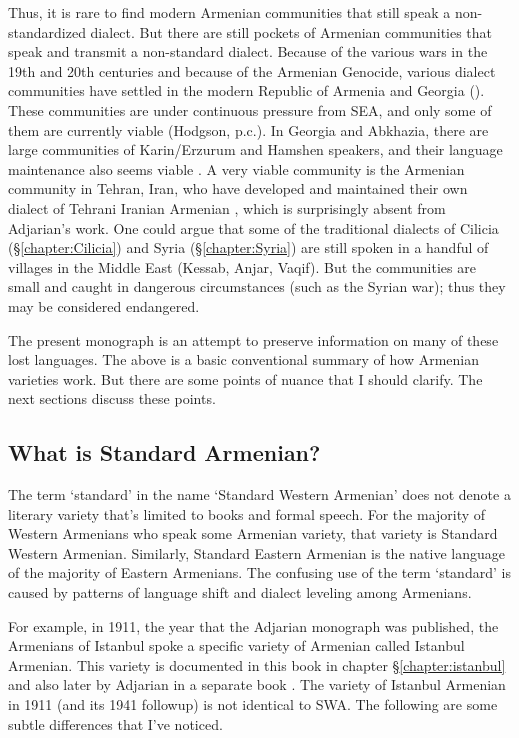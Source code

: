 Thus, it is  rare to find modern Armenian communities that still speak a non-standardized dialect. But there are still pockets of Armenian communities that speak and transmit a non-standard dialect.  Because of the various wars in the 19th and 20th centuries and because of the Armenian Genocide, various dialect communities have settled in the modern Republic of Armenia and Georgia (\citealt[\S2.2.2]{Hodgson-2019-DissRelativeClauseArmenianSyntax}). These communities are under continuous pressure from SEA, and only some of them are currently viable (Hodgson, p.c.). In Georgia and Abkhazia, there  are  large communities of Karin/Erzurum and Hamshen speakers, and their language maintenance also seems viable \citep{Bezrukov-2022-DissCaucasusMotionArmenian}.  A very viable community is the Armenian community in Tehran, Iran, who have developed and maintained their own dialect of Tehrani Iranian Armenian \citep{DolatianEtAl-prep-IranianGrammar}, which is surprisingly absent from Adjarian's work. One could argue that some of the traditional dialects of Cilicia (\S\ref{chapter:Cilicia}) and Syria (\S\ref{chapter:Syria}) are still spoken in a handful of villages in the Middle East (Kessab, Anjar, Vaqif). But the communities are small and caught in dangerous circumstances (such as the Syrian war); thus they may be considered endangered.

 The present monograph is an attempt to preserve information on many of these lost languages. The above is a basic conventional summary of how Armenian varieties work. But there are some points of nuance that I should clarify. The next sections discuss these points. 

 

\subsection{What is Standard Armenian?}\label{sec:HossepIntro:armenian:whatisstandard}
The term `standard' in the name `Standard Western Armenian' does not denote a literary variety that's limited to books and formal speech. For the majority of Western Armenians who speak some Armenian variety, that variety is Standard Western Armenian. Similarly, Standard Eastern Armenian is the native language of the majority of Eastern Armenians. The confusing use of the term `standard' is caused by patterns of language shift and dialect leveling among Armenians.

For example, in 1911, the year that the Adjarian monograph was published, the Armenians of Istanbul spoke a specific variety of Armenian called Istanbul Armenian. This variety is documented in this book in chapter \S\ref{chapter:istanbul} and also later by Adjarian in a separate book \citep{Adjarian-1941-IstanbulDialect}. The variety of Istanbul Armenian in 1911 (and its 1941 followup) is not identical to SWA. The following are some subtle differences that I've noticed. 

